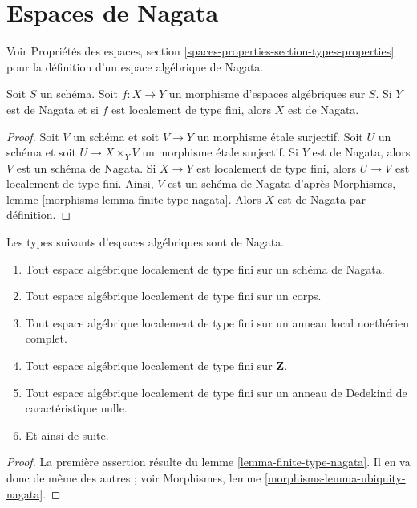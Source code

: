 \section{Espaces de Nagata}
\label{section-nagata}

\noindent
Voir Propriétés des espaces, section
\ref{spaces-properties-section-types-properties} pour la définition
d'un espace algébrique de Nagata.

\begin{lemma}
\label{lemma-finite-type-nagata}
Soit $S$ un schéma.
Soit $f : X \to Y$ un morphisme d'espaces algébriques sur $S$.
Si $Y$ est de Nagata et si $f$ est localement de type fini, alors $X$ est de Nagata.
\end{lemma}

\begin{proof}
Soit $V$ un schéma et soit $V \to Y$ un morphisme étale surjectif.
Soit $U$ un schéma et soit $U \to X \times_Y V$ un morphisme étale
surjectif. Si $Y$ est de Nagata, alors $V$ est un schéma de Nagata.
Si $X \to Y$ est localement de type fini, alors $U \to V$ est localement
de type fini. Ainsi, $V$ est un schéma de Nagata d'après
Morphismes, lemme \ref{morphisms-lemma-finite-type-nagata}.
Alors $X$ est de Nagata par définition.
\end{proof}

\begin{lemma}
\label{lemma-ubiquity-nagata}
Les types suivants d'espaces algébriques sont de Nagata.
\begin{enumerate}
\item Tout espace algébrique localement de type fini sur un schéma de Nagata.
\item Tout espace algébrique localement de type fini sur un corps.
\item Tout espace algébrique localement de type fini sur un
anneau local noethérien complet.
\item Tout espace algébrique localement de type fini sur $\mathbf{Z}$.
\item Tout espace algébrique localement de type fini sur un anneau de Dedekind de
caractéristique nulle.
\item Et ainsi de suite.
\end{enumerate}
\end{lemma}

\begin{proof}
La première assertion résulte du lemme \ref{lemma-finite-type-nagata}.
Il en va donc de même des autres ; voir
Morphismes, lemme \ref{morphisms-lemma-ubiquity-nagata}.
\end{proof}








